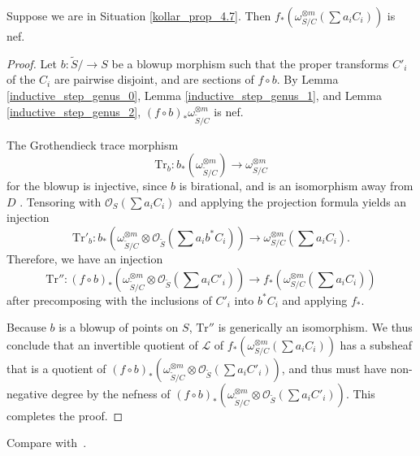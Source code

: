 \begin{lemma}
Suppose we are in Situation \ref{kollar_prop_4.7}.
Then $f_{*}\left(\omega_{S/C}^{\otimes m}\left(\sum a_iC_i\right)\right)$ is nef.
\end{lemma}
\begin{proof}
Let $b:\widetilde{S}/\to S$ be a blowup morphism such that the proper transforms $C'_i$ of the $C_i$ are pairwise disjoint, and are sections of $f\circ b$.
By Lemma \ref{inductive_step_genus_0}, Lemma \ref{inductive_step_genus_1}, and Lemma \ref{inductive_step_genus_2}, $(f\circ b)_{*}\omega_{\widetilde{S}/C}^{\otimes m}$ is nef.

The Grothendieck trace morphism
$$
\mathrm{Tr}_b : b_*(\omega_{\widetilde{S}/C}^{\otimes m})
\longrightarrow \omega_{S/C}^{\otimes m}
$$
for the blowup is injective, since $b$ is birational, and is an isomorphism away
from $D$ \cite[Prop.\ 5.77]{km}.
Tensoring with $\mathcal{O}_{S}\left(\sum a_iC_i\right)$ and applying the
projection formula yields an injection
$$
\mathrm{Tr}'_b : b_*\left(\omega_{\widetilde{S}/C}^{\otimes m}\otimes\mathcal{O}_{\widetilde{S}}\left(\sum a_ib^{*}C_i\right)\right)
\longrightarrow \omega_{S/C}^{\otimes m}\left(\sum a_iC_i\right).
$$
Therefore, we have an injection
$$
\mathrm{Tr}'':(f\circ b)_{*}\left(\omega_{\widetilde{S}/C}^{\otimes m}\otimes\mathcal{O}_{\widetilde{S}}\left(\sum a_iC'_i\right)\right)
\longrightarrow f_{*}\left(\omega_{S/C}^{\otimes m}\left(\sum a_iC_i\right)\right)
$$
after precomposing with the inclusions of $C'_i$ into $b^*C_i$ and applying $f_*$.

Because $b$ is a blowup of points on $S$, $\mathrm{Tr}''$ is generically an isomorphism.
We thus conclude that an invertible quotient of $\mathcal{L}$ of $f_{*}\left(\omega_{S/C}^{\otimes m}\left(\sum a_iC_i\right)\right)$ has a subsheaf that is a quotient of $(f\circ b)_{*}\left(\omega_{\widetilde{S}/C}^{\otimes m}\otimes\mathcal{O}_{\widetilde{S}}\left(\sum a_iC'_i\right)\right)$, and thus must have non-negative degree by the nefness of $(f\circ b)_{*}\left(\omega_{\widetilde{S}/C}^{\otimes m}\otimes\mathcal{O}_{\widetilde{S}}\left(\sum a_iC'_i\right)\right)$.
This completes the proof.
\end{proof}

Compare with~\cite[Theorem 4.9]{ko90}.

